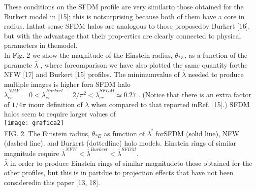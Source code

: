 \documentclass{article}\newcommand\Star[1]{#1\textsuperscript{*}}
\begin{document}
\begin{multicols}{2}
These conditions on the SFDM profile are very similarto those obtained for the Burkert model in [15]; this is notsurprising because both of them have a core in radius.  Inthat sense SFDM halos are analogous to those proposedby Burkert [16], but with the advantage that their prop-erties are clearly connected to physical parameters in themodel.\\
In  Fig.  2  we  show  the  magnitude  of  the  Einstein  radius, \(\theta_{*E}\),  as  a  function  of  the  paramete \(\bar{\lambda}\) ,  where  forcomparison we have also plotted the same quantity forthe NFW [17] and Burkert [15] profiles.  The minimumvalue of \(\bar{\lambda}\) needed to produce multiple images is higher fora SFDM halo \(\bar{\lambda}_{cr}^{NFW} = 0 < \bar{\lambda}_{er}^{Burkert} = 2/\pi^{2} < \bar{\lambda}_{cr}^{SFDM} \simeq 0.27 \) .   (Notice  that  there  is  an  extra  factor  of \(1/4\pi\) inour  definition  of \(\bar{\lambda}\) when  compared  to  that  reported  inRef. [15].)  SFDM halos seem to require larger values of \\
\texttt{[image: grafica2]} \\
FIG.  2.    The  Einstein  radius, \(\theta_{*E}\)  as  function  of \(\bar{\lambda}^{i}\) forSFDM (solid line), NFW (dashed line), and Burkert (dottedline) halo models.  Einstein rings of similar magnitude require \(\bar{\lambda}^{NFW}<\bar{\lambda}^{Burkert}<\bar{\lambda}^{SFDM}\). \\
\(\bar{\lambda}\) in order to produce Einstein rings of similar magnitudeto those obtained for the other profiles, but this is in partdue to projection effects that have not been consideredin this paper [13, 18].

\end{multicols}
\end{document}
